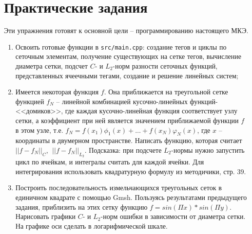 \documentclass[a4paper, 11pt]{article}
\begin{document}
\section{Практические задания}
Эти упражнения готовят к основной цели -- программированию настоящего МКЭ.
\begin{enumerate}
	\item Освоить готовые функции в \texttt{src/main.cpp}: создание тегов и циклы по сеточным элементам, получение существующих на сетке тегов, вычисление диаметра сетки, подсчет $C$- и $L_2$-норм разности сеточных функций, представленных ячеечными тегами, создание и решение линейных систем;
	\item Имеется некоторая функция $f$. Она приближается на треугольной сетке функцией $f_N$ -- линейной комбинацией кусочно-линейных функций-<<домиков>>, где каждая кусочно-линейная функция соответствует узлу сетки, а коэффициент при ней является значением приближаемой функции $f$ в этом узле, т.е. $f_N = f(x_1)\phi_1(x) + \dots + f(x_N)\varphi_N(x)$, где $x$ -- координаты в двумерном пространстве. Написать функцию, которая считает $||f-f_N||_C,~~||f-f_N||_{L_2}$. Подсказка: при подсчете $L_2$-нормы нужно запустить цикл по ячейкам, и интегралы считать для каждой ячейки. Для интегрирования использовать квадратурную формулу из методичики, стр. 39.
	\item Построить последовательность измельчающихся треугольных сеток в единичном квадрате с помощью Gmsh. Пользуясь результатами предыдущего задания, приблизить на этих сетку функцию $f = sin(\Pi x) * sin(\Pi y)$. Нарисовать графики $C$- и $L_2$-норм ошибки в зависимости от диаметра сетки. На графике оси сделать в логарифмической шкале.
\end{enumerate}
\end{document}
